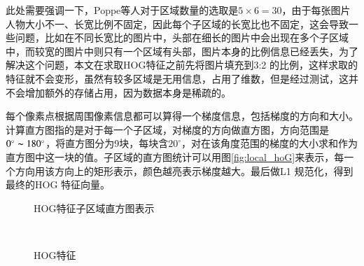 此处需要强调一下，Poppe等人对于区域数量的选取是$5\times 6=30$，由于每张图片人物大小不一、长宽比例不固定，因此每个子区域的长宽比也不固定，这会导致一些问题，比如在不同长宽比的图片中，头部在细长的图片中会出现在多个子区域中，而较宽的图片中则只有一个区域有头部，图片本身的比例信息已经丢失，为了解决这个问题，本文在求取HOG特征之前先将图片填充到3:2 的比例，这样求取的特征就不会变形，虽然有较多区域是无用信息，占用了维数，但是经过测试，这并不会增加额外的存储占用，因为数据本身是稀疏的。

每个像素点根据周围像素信息都可以算得一个梯度信息，包括梯度的方向和大小。计算直方图指的是对于每一个子区域，对梯度的方向做直方图，方向范围是$0^\circ\thicksim180^\circ$，将直方图分为9块，每块含$20^\circ$，对在该角度范围的梯度的大小求和作为直方图中这一块的值。子区域的直方图统计可以用图\ref{fig:local_hoG}来表示，每一个方向用该方向上的矩形表示，颜色越亮表示梯度越大。最后做L1 规范化，得到最终的HOG 特征向量。
\begin{figure}[htbp]
  \centering
  \caption{HOG特征子区域直方图表示}
\end{figure}

\begin{figure}[htbp]
  \centering
  \\
  \caption{HOG特征}
\end{figure}

